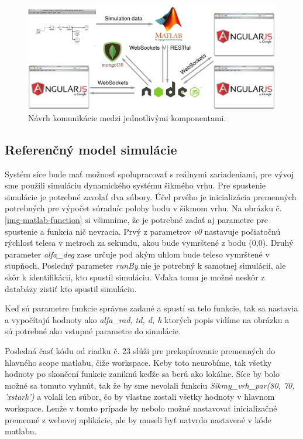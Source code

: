 \begin{figure}[H]
  \centering
  \includegraphics[scale=0.4]{img/software-design.png}
  \caption{Návrh komunikácie medzi jednotlivými komponentami.}
  \label{img-software-designl}
\end{figure}

\subsection{Referenčný model simulácie}
Systém síce bude mať možnosť spolupracovať s reálnymi zariadeniami, pre vývoj sme použili simuláciu dynamického systému šikmého vrhu. Pre spustenie simulácie je potrebné zavolať dva súbory. Účel prvého je inicializácia premenných potrebných pre výpočet súradníc polohy bodu v šikmom vrhu. Na obrázku č.\ref{img-matlab-function} si všimnime, že je potrebné zadať aj parametre pre spustenie a funkcia nič nevracia. Prvý z parametrov \textit{v0} nastavuje počiatočnú rýchlosť telesa v metroch za sekundu, akou bude vymrštené z bodu (0,0). Druhý parameter \textit{alfa\_deg} zase určuje pod akým uhlom bude teleso vymrštené v stupňoch. Posledný parameter \textit{runBy} nie je potrebný k samotnej simulácií, ale skôr k identifikácií, kto spustil simuláciu. Vďaka tomu je možné neskôr z databázy zistiť kto spustil simuláciu.

Keď sú parametre funkcie správne zadané a spustí sa telo funkcie, tak sa nastavia a vypočítajú hodnoty ako \textit{alfa\_rad, td, d, h} ktorých popis vidíme na obrázku a sú potrebné ako vstupné parametre do simulácie.

Posledná časť kódu od riadku č. 23 slúži pre prekopírovanie premenných do hlavného scope matlabu, čiže workspace. Keby toto neurobíme, tak všetky hodnoty po skončení funkcie zaniknú keďže sa berú ako lokálne. Síce by bolo možné sa tomuto vyhnúť, tak že by sme nevolali funkciu \textit{Sikmy\_vrh\_par(80, 70, 'xstark')} a volali len súbor, čo by vlastne zostali všetky hodnoty v hlavnom workspace. Lenže v tomto prípade by nebolo možné nastavovať inicializačné premenné z webovej aplikácie, ale by museli byť natvrdo nastavené v kóde matlabu.

